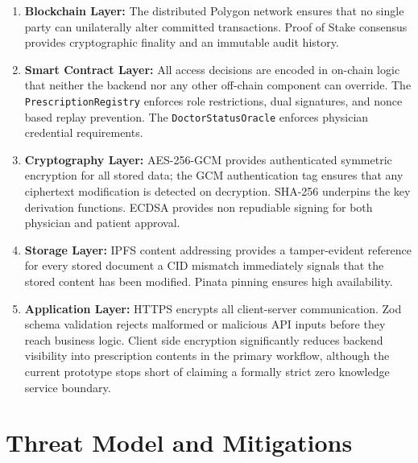 \documentclass[12pt,a4wide]{report}
\begin{document}
\begin{enumerate}
  \item \textbf{Blockchain Layer:} The distributed Polygon network ensures that
    no single party can unilaterally alter committed transactions. Proof of Stake
    consensus provides cryptographic finality and an immutable audit history.
  \item \textbf{Smart Contract Layer:} All access decisions are encoded in
    on-chain logic that neither the backend nor any other off-chain component can
    override. The \texttt{PrescriptionRegistry} enforces role restrictions, dual
    signatures, and nonce based replay prevention. The \texttt{DoctorStatusOracle}
    enforces physician credential requirements.
  \item \textbf{Cryptography Layer:} AES-256-GCM provides authenticated symmetric
    encryption for all stored data; the GCM authentication tag ensures that any
    ciphertext modification is detected on decryption. SHA-256 underpins the key
    derivation functions. ECDSA provides non repudiable signing for both physician
    and patient approval.
  \item \textbf{Storage Layer:} IPFS content addressing provides a tamper-evident
    reference for every stored document a CID mismatch immediately signals that
    the stored content has been modified. Pinata pinning ensures high availability.
  \item \textbf{Application Layer:} HTTPS encrypts all client-server communication.
    Zod schema validation rejects malformed or malicious API inputs before they
    reach business logic. Client side encryption significantly reduces backend
    visibility into prescription contents in the primary workflow, although the
    current prototype stops short of claiming a formally strict zero knowledge
    service boundary.
\end{enumerate}

\section{Threat Model and Mitigations}
\end{document}
